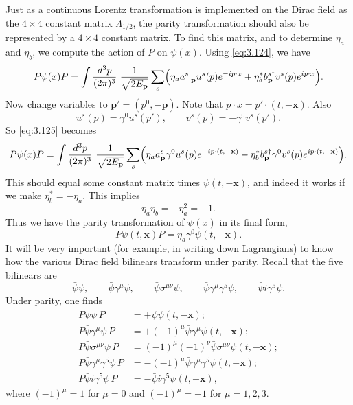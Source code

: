 Just as a continuous Lorentz transformation is implemented on the Dirac field
as the $4\times4$ constant matrix $\Lambda_{1/2}$, the parity transformation
should also be represented by a $4\times4$ constant matrix.  To find this
matrix, and to determine $\eta_a$ and $\eta_b$, we compute the action of $P$
on $\psi(x)$.  Using \eqref{eq:3.124}, we have
\begin{equation}
  P\psi(x)P = \int \frac{d^3p}{(2\pi)^3}\ \frac{1}{\sqrt{2E_{\mathbf{p}}}}
    \sum_s \Bigl( \eta_a a_{-\mathbf{p}}^s u^s(p)e^{-ip\cdot x}
      + \eta_b^{*} b_{\mathbf{p}}^{s\dagger} v^s(p)e^{ip\cdot x} \Bigr).
  \label{eq:3.125}
\end{equation}
Now change variables to $\mathbf{p}' = (p^0, -\mathbf{p})$.  Note that
$p\cdot x = p'\cdot(t,-\mathbf{x})$.  Also
\begin{equation}
  u^s(p) = \gamma^0 u^s(p'),\qquad
  v^s(p) = -\gamma^0 v^s(p').
\end{equation}
So \eqref{eq:3.125} becomes
\begin{equation}
  P\psi(x)P = \int \frac{d^3p}{(2\pi)^3}\ \frac{1}{\sqrt{2E_{\mathbf{p}}}}
    \sum_s \Bigl( \eta_a a_{\mathbf{p}}^s \gamma^0 u^s(p)e^{-ip\cdot
      (t,-\mathbf{x})} - \eta_b^{*} b_{\mathbf{p}}^{s\dagger} \gamma^0 v^s(p)
      e^{ip\cdot(t,-\mathbf{x})} \Bigr).
\end{equation}
This should equal some constant matrix times $\psi(t,-\mathbf{x})$, and
indeed it works if we make $\eta_b^{*} = -\eta_a$.  This implies
\begin{equation}
  \eta_a\eta_b = -\eta_a^2 = -1 .
  \label{eq:3.126}
\end{equation}
Thus we have the parity transformation of $\psi(x)$ in its final form,
\begin{equation}
  P\psi(t,\mathbf{x})P = \eta_a\gamma^0\psi(t,-\mathbf{x}) .
  \label{eq:3.127}
\end{equation}
It will be very important (for example, in writing down Lagrangians) to know
how the various Dirac field bilinears transform under parity.  Recall that
the five bilinears are
\begin{equation}
  \bar{\psi}\psi,\qquad \bar{\psi}\gamma^\mu\psi,\qquad
  \bar{\psi}\sigma^{\mu\nu}\psi,\qquad
  \bar{\psi}\gamma^\mu\gamma^5\psi,\qquad
  \bar{\psi}i\gamma^5\psi .
\end{equation}
Under parity, one finds
\begin{align}
  P\bar{\psi}\psi\,P &= +\bar{\psi}\psi(t,-\mathbf{x});\\
  P\bar{\psi}\gamma^\mu\psi\,P &=
    +(-1)^\mu\bar{\psi}\gamma^\mu\psi(t,-\mathbf{x});\\
  P\bar{\psi}\sigma^{\mu\nu}\psi\,P &=
    (-1)^\mu(-1)^\nu\bar{\psi}\sigma^{\mu\nu}\psi(t,-\mathbf{x});\\
  P\bar{\psi}\gamma^\mu\gamma^5\psi\,P &=
    -(-1)^\mu\bar{\psi}\gamma^\mu\gamma^5\psi(t,-\mathbf{x});\\
  P\bar{\psi}i\gamma^5\psi\,P &=
    -\bar{\psi}i\gamma^5\psi(t,-\mathbf{x}),
\end{align}
where $(-1)^\mu = 1$ for $\mu = 0$ and $(-1)^\mu = -1$ for
$\mu = 1, 2, 3$.

